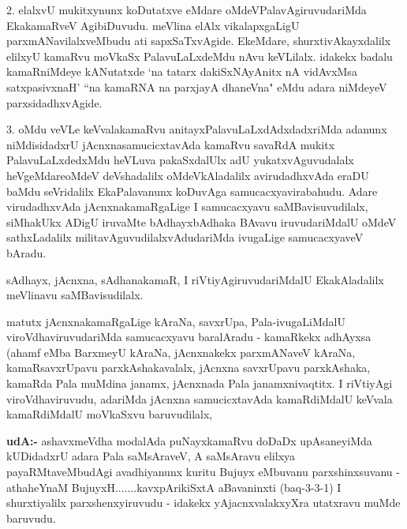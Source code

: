 \begin{artha}
2. elalxvU mukitxynunx koDutatxve eMdare oMdeVPalavAgiruvudariMda EkakamaRveV AgibiDuvudu. meVlina elAlx vikalapxgaLigU parxmANavilalxveMbudu ati sapxSaTxvAgide. EkeMdare, shurxtivAkayxdalilx elilxyU kamaRvu moVkaSx PalavuLaLxdeMdu nAvu keVLilalx. idakekx badalu kamaRniMdeye kANutatxde `na tatarx dakiSxNAyAnitx nA vidAvxMsa satxpasivxnaH' ``na kamaRNA na parxjayA dhaneVna" eMdu adara niMdeyeV parxsidadhxvAgide.
\end{artha}

\begin{artha}
3. oMdu veVLe keVvalakamaRvu anitayxPalavuLaLxdAdxdadxriMda adanunx niMdisidadxrU jAcnxnasamucicxtavAda kamaRvu savaRdA mukitx PalavuLaLxdedxMdu heVLuva pakaSxdalUlx adU yukatxvAguvudalalx heVgeMdare\mdash  oMdeV deVshadalilx oMdeVkAladalilx avirudadhxvAda eraDU baMdu seVridalilx EkaPalavanunx koDuvAga samucacxyavirabahudu. Adare virudadhxvAda jAcnxnakamaRgaLige I samucacxyavu saMBavisuvudilalx, siMhakUkx ADigU iruvaMte bAdhayxbAdhaka BAvavu iruvudariMdalU oMdeV sathxLadalilx militavAguvudilalxvAdudariMda ivugaLige samucacxyaveV bAradu.
\end{artha}

\begin{artha}
sAdhayx, jAcnxna, sAdhanakamaR, I riVtiyAgiruvudariMdalU EkakAladalilx meVlinavu 
saMBavisudilalx.
\end{artha}


\begin{artha}
matutx jAcnxnakamaRgaLige kAraNa, savxrUpa, Pala-ivugaLiMdalU viroVdhaviruvudariMda samucacxyavu baralAradu - kamaRkekx adhAyxsa (ahamf eMba BarxmeyU kAraNa, jAcnxnakekx parxmANaveV kAraNa, kamaRsavxrUpavu parxkAshakavalalx, jAcnxna savxrUpavu parxkAshaka, kamaRda Pala muMdina janamx, jAcnxnada Pala janamxnivaqtitx. I riVtiyAgi viroVdhaviruvudu, adariMda jAcnxna samucicxtavAda kamaRdiMdalU keVvala kamaRdiMdalU moVkaSxvu baruvudilalx, 
\end{artha}


\begin{artha}
{\bf udA:-} ashavxmeVdha modalAda puNayxkamaRvu doDaDx upAsaneyiMda kUDidadxrU adara Pala saMsAraveV, A saMsAravu elilxya payaRMtaveMbudAgi avadhiyanunx kuritu Bujuyx eMbuvanu parxshinxsuvanu - athaheYnaM BujuyxH.......kavxpArikiSxtA aBavaninxti (baq-3-3-1) I shurxtiyalilx parxshenxyiruvudu - idakekx yAjacnxvalakxyXra utatxravu muMde baruvudu.
\end{artha}

